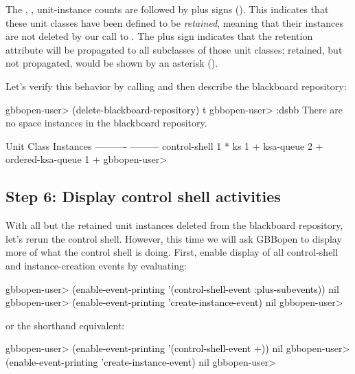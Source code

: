 \documentclass[10pt,twoside,english,pdftex]{article}
\begin{document}
The , , 
unit-instance counts are followed by plus signs (\code{+}).  This indicates
that these unit classes have been defined to be \textit{retained}, meaning
that their instances are not deleted by our call to
.  The plus sign indicates that
the retention attribute will be propagated to all subclasses of those unit
classes; retained, but not propagated, would be shown by an asterisk
(\code{*}).

%
%
Let's verify this behavior by calling
 and then describe the blackboard
repository:
%
\W\supp
\begin{example}
\textcolor{darkergray}{%
  gbbopen-user> \textcolor{black}{(delete-blackboard-repository)}
  t
  gbbopen-user> \textcolor{black}{:dsbb}
  There are no space instances in the blackboard repository.

  Unit Class                    Instances
  ----------                    ---------
  control-shell                         1 *
  ks                                    1 +
  ksa-queue                             2 +
  ordered-ksa-queue                     1 +
  gbbopen-user>}
\end{example}

\subsection*{Step 6: Display control shell activities}

With all but the retained unit instances deleted from the blackboard
repository, let's rerun the control shell.  However, this time we will ask
GBBopen to display more of what the control shell is doing. First, enable
display of all control-shell and instance-creation events by evaluating:
%
\W\supp
\begin{example}
\textcolor{darkergray}{%
  gbbopen-user> \textcolor{black}{(enable-event-printing '(control-shell-event :plus-subevents))}
  nil
  gbbopen-user> \textcolor{black}{(enable-event-printing 'create-instance-event)}
  nil
  gbbopen-user>}
\end{example}
%
or the shorthand equivalent:
%
\W\supp\notpretop
\begin{example}
\textcolor{darkergray}{%
  gbbopen-user> \textcolor{black}{(enable-event-printing '(control-shell-event +))}
  nil
  gbbopen-user> \textcolor{black}{(enable-event-printing 'create-instance-event)}
  nil
  gbbopen-user>}
\end{example}
\end{document}
